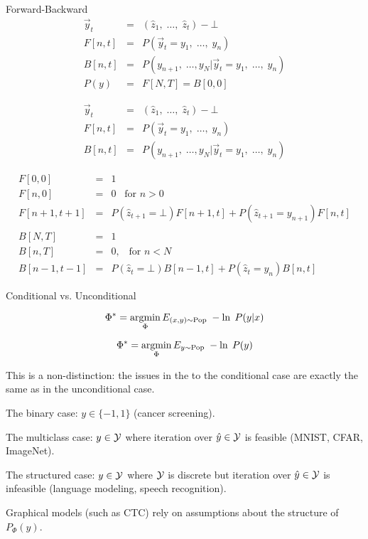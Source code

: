 {\vfill

Forward-Backward
\begin{eqnarray*}
  \vec{y}_t & = & (\hat{z}_1,\;\ldots,\;\hat{z}_t)-\bot \\
  F[n,t] & = & P(\vec{y}_t = y_1,\;\ldots,\;y_n) \\
  B[n,t] & = & P(y_{n+1},\;\ldots,y_N | \vec{y}_t = y_1,\;\ldots,\;y_n) \\
  P(y) & = & F[N,T] = B[0,0]
\end{eqnarray*}




\begin{eqnarray*}
  \vec{y}_t & = & (\hat{z}_1,\;\ldots,\;\hat{z}_t)-\bot \\
  F[n,t] & = & P(\vec{y}_t = y_1,\;\ldots,\;y_n) \\
  B[n,t] & = & P(y_{n+1},\;\ldots,y_N | \vec{y}_t = y_1,\;\ldots,\;y_n)
\end{eqnarray*}

\begin{eqnarray*}
  F[0,0] & = & 1 \\
  F[n,0] & = & 0 \;\;\;\mbox{for $n > 0$} \\
  F[n+1,t+1] & = & P(\hat{z}_{t+1} = \bot) F[n+1,t] + P(\hat{z}_{t+1} = y_{n+1})F[n,t] \\
  \\
  B[N,T] & = & 1 \\
  B[n,T] & = & 0,\;\;\;\mbox{for $n < N$} \\
  B[n-1,t-1] & = & P(\hat{z}_t = \bot)B[n-1,t] +  P(\hat{z}_t = y_n)B[n,t]
\end{eqnarray*}


Conditional vs. Unconditional

\vfill
$$\Phi^* = \operatorname*{argmin}_\Phi E_{(x,y) \sim \mathrm{Pop}}\;-\ln \;P(y|x)$$

\vfill
$$\Phi^* = \operatorname*{argmin}_\Phi E_{y \sim \mathrm{Pop}}\;-\ln \;P(y)$$

\vfill
This is a non-distinction: the issues in the to the conditional case
are exactly the same as in the unconditional case.


The binary case: $y \in \{-1,1\}$ (cancer screening).

\vfill
The multiclass case: $y \in {\cal Y}$ where iteration over $\hat{y} \in {\cal Y}$ is feasible (MNIST, CFAR, ImageNet).

\vfill
{\color{red} The structured case: $y \in {\cal Y}$ where ${\cal Y}$ is discrete but iteration over $\hat{y} \in {\cal Y}$ is infeasible} (language modeling, speech recognition).

\vfill
{\color{red} Graphical models (such as CTC) rely on assumptions about the structure of $P_\Phi(y)$.}


}


